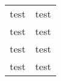 \documentclass{article}
\begin{document}
\def\test{
  \directlua{
    local lparse = require('lparse')
    print(lparse.scan('v'))
  }
}

\begin{tabular}{ll}
\test{test} & \test{test} \\
\test{test} & \test{test} \\
\test{test} & \test{test} \\
\test{test} & \test{test} \\
\end{tabular}
\end{document}
